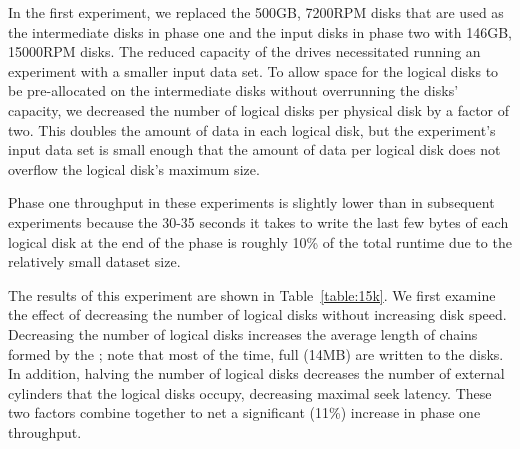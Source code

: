 In the first experiment, we replaced the 500GB, 7200RPM disks that are used as
the intermediate disks in phase one and the input disks in phase two with
146GB, 15000RPM disks. The reduced capacity of the drives necessitated running
an experiment with a smaller input data set.  To allow space for the logical
disks to be pre-allocated on the intermediate disks without overrunning the
disks' capacity, we decreased the number of logical disks per physical disk by
a factor of two. This doubles the amount of data in each logical disk, but the
experiment's input data set is small enough that the amount of data per logical
disk does not overflow the logical disk's maximum size.

Phase one throughput in these experiments is slightly lower than in subsequent
experiments because the 30-35 seconds it takes to write the last few bytes of
each logical disk at the end of the phase is roughly 10\% of the total runtime
due to the relatively small dataset size.

\begin{table}
\centering
\caption{\label{table:15k}Effect of increasing speed of intermediate disks
  on a two node, 500GB sort}
\end{table}

The results of this experiment are shown in Table~\ref{table:15k}.  We first
examine the effect of decreasing the number of logical disks without increasing
disk speed. Decreasing the number of logical disks increases the average length
of \ldbuffer chains formed by the \ldts; note that most of the time, full
\writerbuffers (14MB) are written to the disks. In addition, halving the number
of logical disks decreases the number of external cylinders that the logical
disks occupy, decreasing maximal seek latency. These two factors combine
together to net a significant (11\%) increase in phase one throughput.

